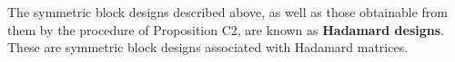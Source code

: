 The symmetric block designs described above, as well as those obtainable from them by the procedure of Proposition C2, are known as \textbf{Hadamard designs}. These are symmetric block designs associated with Hadamard matrices.
